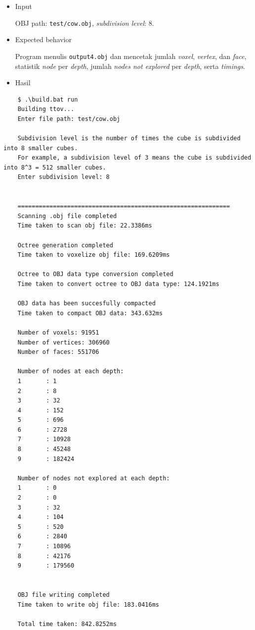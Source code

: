 \documentclass[11pt,a4paper]{article}
\begin{document}
\begin{itemize}[leftmargin=*, itemsep=0.75\baselineskip, topsep=0.5\baselineskip]
    \item Input

    OBJ path: \texttt{test/cow.obj}, \textit{subdivision level}: $8$.

    \item Expected behavior

    Program menulis \texttt{output4.obj} dan mencetak jumlah \textit{voxel}, \textit{vertex}, dan \textit{face}, statistik \textit{node} per \textit{depth}, jumlah \textit{nodes not explored} per \textit{depth}, serta \textit{timings}.

    \item Hasil
\end{itemize}

\begin{verbatim}
    $ .\build.bat run
    Building ttov...
    Enter file path: test/cow.obj
    
    Subdivision level is the number of times the cube is subdivided into 8 smaller cubes.
    For example, a subdivision level of 3 means the cube is subdivided into 8^3 = 512 smaller cubes.
    Enter subdivision level: 8
    
    
    ============================================================
    Scanning .obj file completed
    Time taken to scan obj file: 22.3386ms
    
    Octree generation completed
    Time taken to voxelize obj file: 169.6209ms
    
    Octree to OBJ data type conversion completed
    Time taken to convert octree to OBJ data type: 124.1921ms
    
    OBJ data has been succesfully compacted
    Time taken to compact OBJ data: 343.632ms
    
    Number of voxels: 91951
    Number of vertices: 306960
    Number of faces: 551706
    
    Number of nodes at each depth:
    1       : 1
    2       : 8
    3       : 32
    4       : 152
    5       : 696
    6       : 2728
    7       : 10928
    8       : 45248
    9       : 182424
    
    Number of nodes not explored at each depth:
    1       : 0
    2       : 0
    3       : 32
    4       : 104
    5       : 520
    6       : 2840
    7       : 10896
    8       : 42176
    9       : 179560
    
    
    OBJ file writing completed
    Time taken to write obj file: 183.0416ms
    
    Total time taken: 842.8252ms
\end{verbatim}
\end{document}

